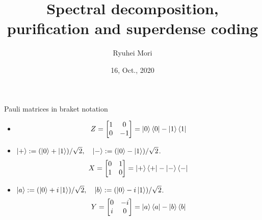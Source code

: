 \documentclass[10pt]{beamer}
\title{Spectral decomposition, purification and superdense coding}
\author{Ryuhei Mori}
\institute{Tokyo Institute of Technology}
\date{16, Oct., 2020}
\begin{document}
\begin{frame}[plain]
\maketitle
\end{frame}

\begin{frame}{Pauli matrices in braket notation}
\begin{itemize}
\setlength{\itemsep}{3em}
\item
\begin{equation*}
Z=\begin{bmatrix}1&0\\0&-1\end{bmatrix}=
\ket{0}\bra{0}
-\ket{1}\bra{1}
\end{equation*}
\item
$\ket{+}:=(\ket{0}+\ket{1})/\sqrt{2},\quad  \ket{-}:=(\ket{0}-\ket{1})/\sqrt{2}$.
\begin{equation*}
X=\begin{bmatrix}0&1\\1&0\end{bmatrix}=
\ket{+}\bra{+}
-\ket{-}\bra{-}
\end{equation*}
\item
$\ket{a}:=(\ket{0}+i\ket{1})/\sqrt{2},\quad  \ket{b}:=(\ket{0}-i\ket{1})/\sqrt{2}$.
\begin{equation*}
Y=\begin{bmatrix}0&-i\\i&0\end{bmatrix}=
\ket{a}\bra{a}
-\ket{b}\bra{b}
\end{equation*}
\end{itemize}
\end{frame}
\end{document}
